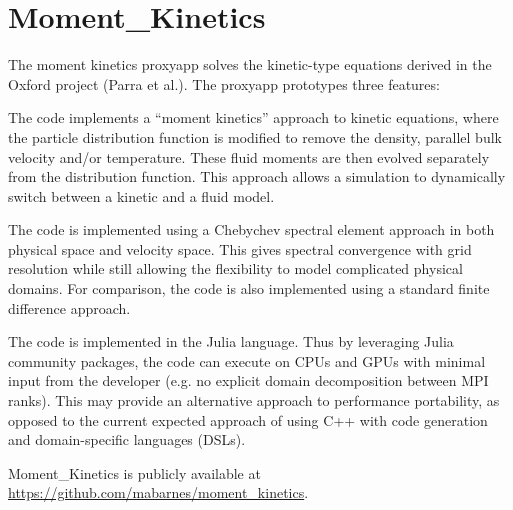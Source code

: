 \section{Moment\_Kinetics}

The moment kinetics proxyapp solves the kinetic-type equations derived in the Oxford project (Parra et al.). The proxyapp prototypes three features:

The code implements a “moment kinetics” approach to kinetic equations, where the particle distribution function is modified to remove the density, parallel bulk velocity and/or temperature. These fluid moments are then evolved separately from the distribution function. This approach allows a simulation to dynamically switch between a kinetic and a fluid model.

The code is implemented using a Chebychev spectral element approach in both physical space and velocity space. This gives spectral convergence with grid resolution while still allowing the flexibility to model complicated physical domains. For comparison, the code is also implemented using a standard finite difference approach.

The code is implemented in the Julia language. Thus by leveraging Julia community packages, the code can execute on CPUs and GPUs with minimal input from the developer (e.g. no explicit domain decomposition between MPI ranks). This may provide an alternative approach to performance portability, as opposed to the current expected approach of using C++ with code generation and domain-specific languages (DSLs).


Moment\_Kinetics is publicly available at \url{https://github.com/mabarnes/moment_kinetics}.
